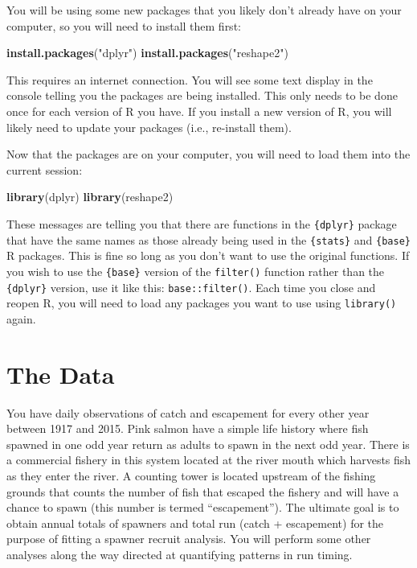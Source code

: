 \documentclass[]{book}
\newenvironment{Shaded}{\begin{snugshade}}{\end{snugshade}}
\newcommand{\KeywordTok}[1]{\textcolor[rgb]{0.13,0.29,0.53}{\textbf{#1}}}
\newcommand{\StringTok}[1]{\textcolor[rgb]{0.31,0.60,0.02}{#1}}
\newcommand{\NormalTok}[1]{#1}
\theoremstyle{definition}
\theoremstyle{definition}
\theoremstyle{definition}
\theoremstyle{remark}
\begin{document}
You will be using some new packages that you likely don't already have
on your computer, so you will need to install them first:

\begin{Shaded}
\begin{Highlighting}[]
\KeywordTok{install.packages}\NormalTok{(}\StringTok{"dplyr"}\NormalTok{)}
\KeywordTok{install.packages}\NormalTok{(}\StringTok{"reshape2"}\NormalTok{)}
\end{Highlighting}
\end{Shaded}

This requires an internet connection. You will see some text display in
the console telling you the packages are being installed. This only
needs to be done once for each version of R you have. If you install a
new version of R, you will likely need to update your packages (i.e.,
re-install them).

Now that the packages are on your computer, you will need to load them
into the current session:

\begin{Shaded}
\begin{Highlighting}[]
\KeywordTok{library}\NormalTok{(dplyr)}
\KeywordTok{library}\NormalTok{(reshape2)}
\end{Highlighting}
\end{Shaded}

These messages are telling you that there are functions in the
\texttt{\{dplyr\}} package that have the same names as those already
being used in the \texttt{\{stats\}} and \texttt{\{base\}} R packages.
This is fine so long as you don't want to use the original functions. If
you wish to use the \texttt{\{base\}} version of the \texttt{filter()}
function rather than the \texttt{\{dplyr\}} version, use it like this:
\texttt{base::filter()}. Each time you close and reopen R, you will need
to load any packages you want to use using \texttt{library()} again.

\section{The Data}\label{the-data}

You have daily observations of catch and escapement for every other year
between 1917 and 2015. Pink salmon have a simple life history where fish
spawned in one odd year return as adults to spawn in the next odd year.
There is a commercial fishery in this system located at the river mouth
which harvests fish as they enter the river. A counting tower is located
upstream of the fishing grounds that counts the number of fish that
escaped the fishery and will have a chance to spawn (this number is
termed ``escapement''). The ultimate goal is to obtain annual totals of
spawners and total run (catch + escapement) for the purpose of fitting a
spawner recruit analysis. You will perform some other analyses along the
way directed at quantifying patterns in run timing.
\end{document}
